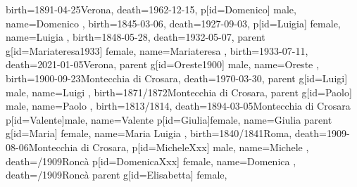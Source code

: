 \documentclass{article}
\begin{document}
\begin{midpage}
\begin{center}
\begin{genealogypicture}
{{{{{                    birth={1891-04-25}{Verona},
                    death={1962-12-15}{},
                }
                p[id=Domenico]{
                    male,
                    name={Domenico },
                    birth={1845-03-06}{},
                    death={1927-09-03}{},
                }
                p[id=Luigia]{
                    female,
                    name={Luigia },
                    birth={1848-05-28}{},
                    death={1932-05-07}{},
                }
            }
        }
        parent{
            g[id=Mariateresa1933]{
                female,
                name={Mariateresa },
                birth={1933-07-11}{},
                death={2021-01-05}{Verona},
            }
            parent{
                g[id=Oreste1900]{
                    male,
                    name={Oreste },
                    birth={1900-09-23}{Montecchia di Crosara},
                    death={1970-03-30}{},
                }
                parent{
                    g[id=Luigi]{
                        male,
                        name={Luigi },
                        birth={1871/1872}{Montecchia di Crosara},
                    }
                    parent{
                        g[id=Paolo]{
                            male,
                            name={Paolo },
                            birth={1813/1814}{},
                            death={1894-03-05}{Montecchia di Crosara}
                        }
                        p[id=Valente]{male, name={Valente }}
                        p[id=Giulia]{female, name={Giulia }}
                    }
                    parent{
                        g[id=Maria]{
                            female,
                            name={Maria Luigia },
                            birth={1840/1841}{Roma},
                            death={1909-08-06}{Montecchia di Crosara},
                        }
                        p[id=MicheleXxx]{
                            male,
                            name={Michele },
                            death={/1909}{Roncà}
                        }
                        p[id=DomenicaXxx]{
                            female,
                            name={Domenica },
                            death={/1909}{Roncà}
                        }
                    }
                }
                parent{
                    g[id=Elisabetta]{
                        female,
}}}}}}
\end{genealogypicture}
\end{center}
\end{midpage}
\end{document}
